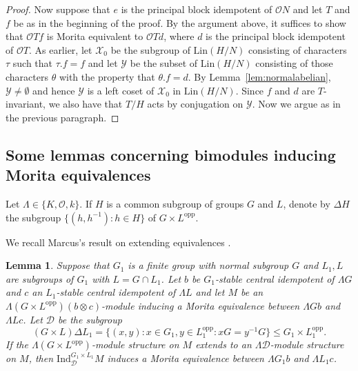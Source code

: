 \documentclass{amsart}
\theoremstyle{plain}\newtheorem{Theorem}{Theorem}[section]
\theoremstyle{plain}\newtheorem{Conjecture}[Theorem]{Conjecture}
\theoremstyle{plain}\newtheorem{Corollary}[Theorem]{Corollary}
\theoremstyle{plain}\newtheorem{Lemma}[Theorem]{Lemma}
\theoremstyle{plain}\newtheorem{Proposition}[Theorem]{Proposition}
\theoremstyle{definition}\newtheorem{Definition}[Theorem]{Definition}
\theoremstyle{definition}\newtheorem{Example}[Theorem]{Example}
\theoremstyle{definition}\newtheorem{Examples}[Theorem]{Examples}
\theoremstyle{definition}\newtheorem{Exercise}[Theorem]{Exercise}
\theoremstyle{definition}\newtheorem{Notation}[Theorem]{Notation}
\theoremstyle{definition}\newtheorem{Remark}[Theorem]{Remark}
\theoremstyle{definition}\newtheorem{Remarks}[Theorem]{Remarks}
\def\CD{{\mathcal{D}}} \def\OQ{{\mathcal{O}Q}} \def\OGf{{\mathcal{O}Gf}}
\def\CO{{\mathcal{O}}}    \def\OPE{{\mathcal{O}(P\rtimes E)}}
\def\CX{{\mathcal{X}}}
\def\CY{{\mathcal{Y}}}
\def\Ind{\mathrm{Ind}}    \def\tenC{\otimes_C}
\def\opp{\mathrm{opp}}
\numberwithin{equation}{section}
\begin{document}
\begin{proof}
 Now suppose that $e$  is the principal block idempotent of $\CO N$  and let $T$ and $f$  be  as in the beginning of the proof.  By the argument above, it suffices  to show that  $\CO Tf$ is Morita equivalent to  $\CO T d$, where $d$ is the principal  block idempotent  of  $\CO T$. As earlier, let $\CX_0$ be the subgroup of  $\mathrm{Lin}(H/N)$  consisting  of  characters $\tau  $  such that $\tau. f =f$ and  let 
 $\CY $  be the subset  of  $\mathrm{Lin}(H/N) $  consisting of  those characters $\theta $   with the property  that $\theta. f = d $.   By Lemma~\ref{lem:normalabelian},  $\CY \ne \emptyset  $  and  hence  $\CY $ is   a left coset  of $\CX_0 $  in $ \mathrm{Lin} (H/N)$.  Since $f$ and $d $ are $T$-invariant, we also have that  $T/H$ acts by conjugation on   $\CY$.  Now  we argue as in the previous paragraph.
\end{proof}


\subsection{Some lemmas concerning bimodules inducing Morita equivalences}

Let $\Lambda \in \{K, \CO, k \}$. If $H$ is a common subgroup of groups $G$ and $L$, denote by $\Delta H $  the subgroup $\{(h, h^{-1}):  h \in H \}$
of $G \times L^{\opp}$. 

We recall  Marcus's result on extending equivalences \cite{Marcus}.
\begin{Lemma} \label{lem:marcus} Suppose that $ G_1 $ is  a finite group with normal subgroup $G$   and  $L_1, L $  are   subgroups of $G_1  $ with  $ L= G \cap   L_1 $.    Let $ b$   be $G_1$-stable central idempotent   of $\Lambda G$  and $c $ an $L_1$-stable   central idempotent   of $\Lambda L $ and let $M $ be an $\Lambda(G \times L^{\opp} ) (b \otimes c)$-module  inducing a Morita equivalence between $\Lambda  G b $ and $\Lambda Lc$.  Let  $ \CD$ be the  subgroup  
$$ (G  \times L) \Delta L_1=\{(x, y):  x\in G_1, y \in    L_1^{\opp} :    x G = y^{-1} G \}    \leq   G_1 \times  L_1^{\opp}. $$
If  the $\Lambda (G \times L^{\opp} )$-module  structure on  $M$ extends to  an $\Lambda  \CD  $-module  structure on $M$, then $\Ind_{\CD}^{G_1 \times L_1} M $ induces a Morita equivalence between  $\Lambda  G_1b $ and   $\Lambda L_1 c $.
\end{Lemma} 
\end{document}
